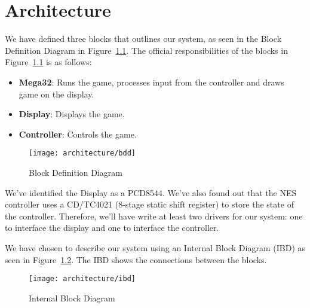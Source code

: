 \chapter{Architecture}

We have defined three blocks that outlines our system, as seen in the Block Definition Diagram in Figure~\ref{fig:bdd}. The official responsibilities of the blocks in Figure~\ref{fig:bdd} is as follows:

\begin{itemize}
	\item \textbf{Mega32}: Runs the game, processes input from the controller and draws game on the display.
	\item \textbf{Display}: Displays the game.
	\item \textbf{Controller}: Controls the game.
\end{itemize}

\begin{figure}
\centering
\texttt{[image: architecture/bdd]}
\caption{Block Definition Diagram}
\label{fig:bdd}
\end{figure}

We've identified the Display as a PCD8544. We've also found out that the NES controller uses a CD/TC4021 (8-stage static shift register) to store the state of the controller. Therefore, we'll have write at least two drivers for our system: one to interface the display and one to interface the controller.

We have chosen to describe our system using an Internal Block Diagram (IBD) as seen in Figure~\ref{fig:ibd}. The IBD shows the connections between the blocks.

\begin{figure}
\centering
\texttt{[image: architecture/ibd]}
\caption{Internal Block Diagram}
\label{fig:ibd}
\end{figure}


